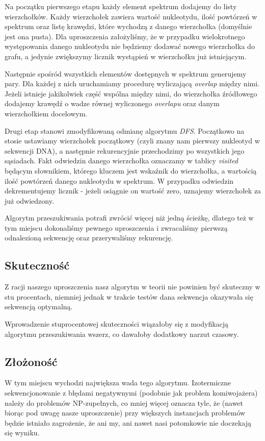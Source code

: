 \documentclass{article}
\begin{document}
Na początku pierwszego etapu każdy element spektrum dodajemy do listy wierzchołków. Każdy wierzchołek zawiera wartość nukleotydu, ilość powtórzeń w spektrum oraz listę krawędzi, które wychodzą z danego wierzchołka (domyślnie jest ona pusta). Dla uproszczenia założyliśmy, że w przypadku wielokrotnego występowania danego nukleotydu nie będziemy dodawać nowego wierzchołka do grafu, a jedynie zwiększymy licznik wystąpień w wierzchołku już istniejącym. 

Następnie spośród wszystkich elementów dostępnych w spektrum generujemy pary. Dla każdej z nich uruchamiamy procedurę wyliczającą \textit{overlap} między nimi. Jeżeli istnieje jakikolwiek część wspólna między nimi, do wierzchołka źródłowego dodajemy krawędź o wadze równej wyliczonego \textit{overlapu} oraz danym wierzchołkiem docelowym. 

Drugi etap stanowi zmodyfikowaną odmianę algorytmu \textit{DFS}. Początkowo na stosie ustawiamy wierzchołek początkowy (czyli znany nam pierwszy nukleotyd w sekwencji DNA), a następnie rekurencyjnie przechodzimy po wszystkich jego sąsiadach. Fakt odwiedzin danego wierzchołka oznaczamy w tablicy \textit{visited} będącym słownikiem, którego kluczem jest wskaźnik do wierzchołka, a wartością ilość powtórzeń danego nukleotydu w spektrum. W przypadku odwiedzin dekrementujemy licznik - jeżeli osiągnie on wartość zero, uznajemy wierzchołek za już odwiedzony. 

Algorytm przeszukiwania potrafi zwrócić więcej niż jedną ścieżkę, dlatego też w tym miejscu dokonaliśmy pewnego uproszczenia i zwracaliśmy pierwszą odnalezioną sekwencję oraz przerywaliśmy rekurencję. 

\subsection{Skuteczność}

Z racji naszego uproszczenia nasz algorytm w teorii nie powinien być skuteczny w stu procentach, niemniej jednak w trakcie testów dana sekwencja okazywała się sekwencją optymalną. 

Wprowadzenie stuprocentowej skuteczności wiązałoby się z modyfikacją algorytmu przeszukiwania wszerz, co dawałoby dodatkowy narzut czasowy. 

\subsection{Złożoność}

W tym miejscu wychodzi największa wada tego algorytmu. Izotermiczne sekwencjonowanie z błędami negatywnymi (podobnie jak problem komiwojażera) należy do problemów NP-zupełnych, co mniej więcej oznacza tyle, że (nawet biorąc pod uwagę nasze uproszczenie) przy większych instancjach problemów będzie istniało zagrożenie, że ani my, ani nawet nasi potomkowie nie doczekają się wyniku. 
\end{document}
